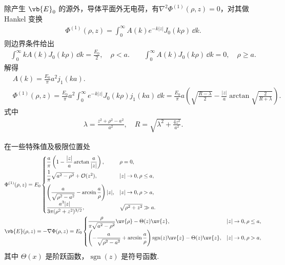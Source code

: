 除产生 \(\vb{E}_0\) 的源外，导体平面外无电荷，有\(\nabla^2 \Phi^{(1)}(\rho, z) = 0\)，对其做 Hankel 变换
\begin{align*}
	\Phi^{(1)}(\rho, z) = \int_0^\infty A(k) e^{-k|z|} J_0(k\rho) \,\dd k.
\end{align*}
则边界条件给出
\begin{align*}
	\int_0^\infty k A(k) J_0(k\rho) \,\dd k = \frac{E_0}{2}, \quad \rho < a. \qquad
	\int_0^\infty A(k) J_0(k\rho) \,\dd k = 0, \quad \rho \ge a.
\end{align*}
解得
\begin{align*}
	&A(k) = \frac{E_0}{\pi} a^2 j_1(ka).\\
	&\Phi^{(1)}(\rho, z)
	= \frac{E_0}{\pi} a^2 \int_0^\infty e^{-k|z|} J_0(k\rho) j_1(ka) \,\dd k
	= \frac{E_0}{\pi} a \left( \sqrt{\frac{R-\lambda}{2}} - \frac{|z|}{a} \arctan\sqrt{\frac{2}{R+\lambda}} \right).
\end{align*}
式中
\begin{align*}
	\lambda = \frac{z^2 + \rho^2 - a^2}{a^2}, \quad
	R = \sqrt{\lambda^2 + \frac{4z^2}{a^2}}.
\end{align*}

在一些特殊值及极限位置处
\begin{align*}
	&\Phi^{(1)}(\rho, z) = E_0
	\begin{cases}
		\dfrac{a}{\pi} \left( 1 - \dfrac{|z|}{a} \arctan\dfrac{a}{|z|} \right),   & \rho = 0,                \\[8pt]
		\dfrac{1}{\pi} \sqrt{a^2 - \rho^2} + \mathcal{O}(z^2),                    & |z| \to 0, \rho \le a,   \\[8pt]
		\left( \dfrac{a}{\sqrt{\rho^2-a^2}} - \arcsin\dfrac{a}{\rho} \right) |z|, & |z| \to 0, \rho > a,     \\[8pt]
		\dfrac{a^3 |z|}{3\pi (\rho^2+z^2)^{3/2}},                                 & \sqrt{\rho^2+z^2} \gg a.
	\end{cases}\\
	&\vb{E}(\rho, z) = -\nabla\Phi(\rho, z) = E_0
	\begin{cases}
		\dfrac{\rho}{\pi\sqrt{a^2-\rho^2}} \uv{\rho} - \Theta(z) \uv{z},                                                       & |z| \to 0, \rho \le a, \\[8pt]
		\left( -\dfrac{a}{\sqrt{\rho^2-a^2}} + \arcsin\dfrac{a}{\rho} \right) \operatorname{sgn}(z) \uv{z} - \Theta(z) \uv{z}, & |z| \to 0, \rho > a,
	\end{cases}
\end{align*}
其中 \(\Theta(x)\) 是阶跃函数，\(\operatorname{sgn}(z)\) 是符号函数.

